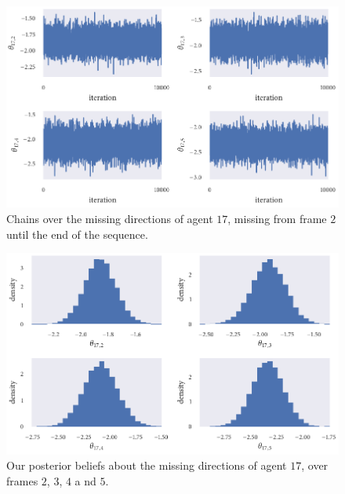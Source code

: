 \begin{figure}[tbp]
	\includegraphics{output/seq05_trace_end_miss_i=17.pdf}
	\caption{Chains over the missing directions of agent $17$, missing from frame $2$ until the end of the
 sequence.}
	\label{fig:seq05_trace_end_miss_i=17}
\end{figure}
\begin{figure}[tbp]
	\includegraphics{output/seq05_hist_end_miss_i=17.pdf}
	\caption{Our posterior beliefs about the missing directions of agent $17$, over frames $2$, $3$, $4$ a
nd $5$.}
	\label{fig:seq05_hist_end_miss_i=17}
\end{figure}
